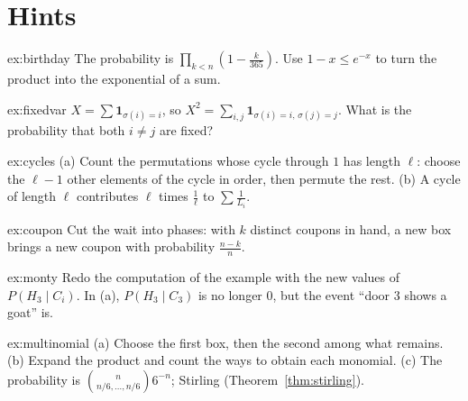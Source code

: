 \section{Hints}

\begin{hint}{ex:birthday}
The probability is $\prod_{k<n}\left(1-\frac k{365}\right)$. Use $1-x\le e^{-x}$ to turn the product into the exponential of a sum.
\end{hint}

\begin{hint}{ex:fixedvar}
$X=\sum\mathbf 1_{\sigma(i)=i}$, so $X^2=\sum_{i,j}\mathbf 1_{\sigma(i)=i,\,\sigma(j)=j}$. What is the probability that both $i\ne j$ are fixed?
\end{hint}
\begin{hint}{ex:cycles}
(a) Count the permutations whose cycle through $1$ has length $\ell$: choose the $\ell-1$ other elements of the cycle in order, then permute the rest. (b) A cycle of length $\ell$ contributes $\ell$ times $\frac1\ell$ to $\sum\frac1{L_i}$.
\end{hint}
\begin{hint}{ex:coupon}
Cut the wait into phases: with $k$ distinct coupons in hand, a new box brings a new coupon with probability $\frac{n-k}n$.
\end{hint}

\begin{hint}{ex:monty}
Redo the computation of the example with the new values of $P(H_3\mid C_i)$. In (a), $P(H_3\mid C_3)$ is no longer $0$, but the event ``door $3$ shows a goat'' is.
\end{hint}
\begin{hint}{ex:multinomial}
(a) Choose the first box, then the second among what remains. (b) Expand the product and count the ways to obtain each monomial. (c) The probability is $\binom n{n/6,\dots,n/6}6^{-n}$; Stirling (Theorem~\ref{thm:stirling}).
\end{hint}

